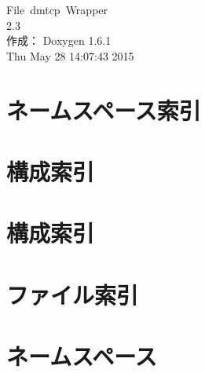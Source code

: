 \documentclass[a4paper]{book}
\begin{document}
\hypersetup{pageanchor=false}
\begin{titlepage}
\vspace*{7cm}
\begin{center}
{\Large File~dmtcp~Wrapper \\[1ex]\large 2.3 }\\
\vspace*{1cm}
{\large 作成： Doxygen 1.6.1}\\
\vspace*{0.5cm}
{\small Thu May 28 14:07:43 2015}\\
\end{center}
\end{titlepage}
\clearemptydoublepage
{}
\tableofcontents
\clearemptydoublepage
{}
\hypersetup{pageanchor=true}
\chapter{ネームスペース索引}

\chapter{構成索引}

\chapter{構成索引}

\chapter{ファイル索引}

\chapter{ネームスペース}














\end{document}
